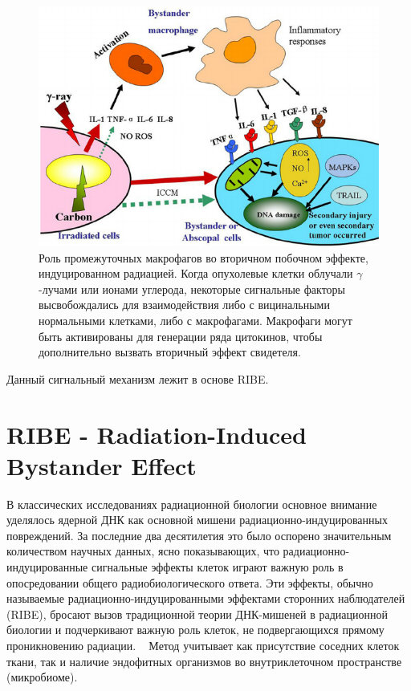 \documentclass[11pt]{article}
\begin{document}
\begin{figure}[!htpb]
\centering
\includegraphics[scale=0.6]{ribe_1}
\caption{Роль промежуточных макрофагов во вторичном побочном эффекте, индуцированном радиацией. Когда опухолевые клетки облучали $\gamma$-лучами или ионами углерода, некоторые сигнальные факторы высвобождались для взаимодействия либо с вицинальными нормальными клетками, либо с макрофагами. Макрофаги могут быть активированы для генерации ряда цитокинов, чтобы дополнительно вызвать вторичный эффект свидетеля. ~\cite{Dong}}
\label{}
\end{figure}

Данный сигнальный механизм лежит в основе RIBE.

\section{RIBE - Radiation-Induced Bystander Effect}
В классических исследованиях радиационной биологии основное внимание уделялось ядерной ДНК как основной мишени радиационно-индуцированных повреждений. За последние два десятилетия это было оспорено значительным количеством научных данных, ясно показывающих, что радиационно-индуцированные сигнальные эффекты клеток играют важную роль в опосредовании общего радиобиологического ответа. Эти эффекты, обычно называемые радиационно-индуцированными эффектами сторонних наблюдателей (RIBE), бросают вызов традиционной теории ДНК-мишеней в радиационной биологии и подчеркивают важную роль клеток, не подвергающихся прямому проникновению радиации. ~\cite{ribe} Метод учитывает как присутствие соседних клеток ткани, так и наличие эндофитных организмов во внутриклеточном пространстве (микробиоме).
\end{document}
